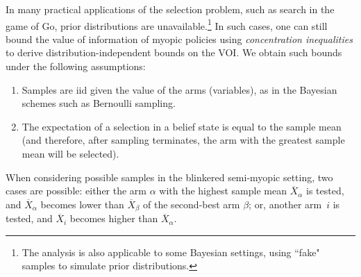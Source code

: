 \documentclass[]{article}
\begin{document}

In many practical applications of the selection problem, such as search in
the game of Go, prior distributions are unavailable.\footnote{The analysis is also applicable to
some Bayesian settings, using ``fake" samples to simulate prior distributions.}
In such cases, one can still bound
the value of information of myopic policies using {\em concentration
inequalities} to derive distribution-independent bounds on the
VOI. We obtain such bounds under the
following assumptions:
\begin{enumerate}
\item Samples are iid given the value of the arms (variables), as in the Bayesian schemes such as Bernoulli
sampling.
\item The expectation of a selection in a belief state is equal to the sample mean (and therefore,
   after sampling terminates, the arm with the greatest sample mean will be selected).
\end{enumerate}

When considering possible samples in the blinkered semi-myopic setting,
two cases are possible: either
	the arm $\alpha$ with the highest sample mean $\overline
  	X_\alpha$ is tested, and $\overline X_\alpha$ becomes lower than
 	$\overline X_\beta$ of the second-best arm $\beta$;
or, 
	another arm~$i$ is tested, and $\overline X_i$ becomes higher
    than $\overline X_\alpha$.
\end{document}
